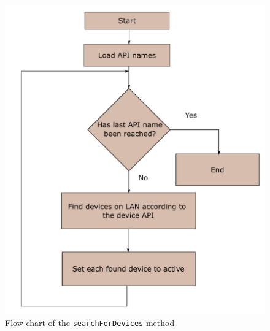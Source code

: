 \documentclass[letterpaper,12pt]{article}   %
\begin{document}
\begin{figure}[H]
    \centering
    \includegraphics[scale=0.45]{figs/agents/searchForDevicesFlow.pdf}
    \caption{Flow chart of the \texttt{searchForDevices} method}
    \label{fig:searchfordevices}
\end{figure}
\end{document}
